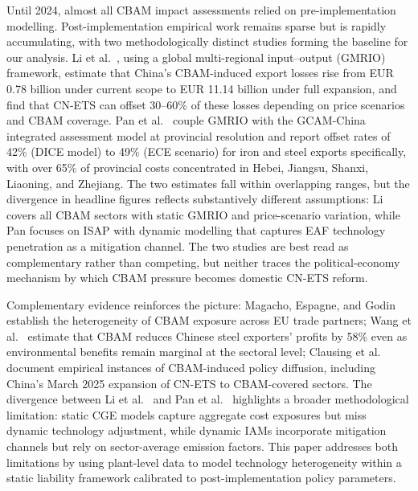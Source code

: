 \documentclass[letterpaper, 10pt, conference]{ieeeconf}
\begin{document}
Until 2024, almost all CBAM impact assessments relied on pre-implementation modelling. Post-implementation empirical work remains sparse but is rapidly accumulating, with two methodologically distinct studies forming the baseline for our analysis. Li et al.\ \citeyearpar{Li2026}, using a global multi-regional input--output (GMRIO) framework, estimate that China's CBAM-induced export losses rise from EUR 0.78 billion under current scope to EUR 11.14 billion under full expansion, and find that CN-ETS can offset 30--60\% of these losses depending on price scenarios and CBAM coverage. Pan et al.\ \citeyearpar{Pan2025} couple GMRIO with the GCAM-China integrated assessment model at provincial resolution and report offset rates of 42\% (DICE model) to 49\% (ECE scenario) for iron and steel exports specifically, with over 65\% of provincial costs concentrated in Hebei, Jiangsu, Shanxi, Liaoning, and Zhejiang. The two estimates fall within overlapping ranges, but the divergence in headline figures reflects substantively different assumptions: Li covers all CBAM sectors with static GMRIO and price-scenario variation, while Pan focuses on ISAP with dynamic modelling that captures EAF technology penetration as a mitigation channel. The two studies are best read as complementary rather than competing, but neither traces the political-economy mechanism by which CBAM pressure becomes domestic CN-ETS reform.

Complementary evidence reinforces the picture: Magacho, Espagne, and Godin \citeyearpar{Magacho2024} establish the heterogeneity of CBAM exposure across EU trade partners; Wang et al.\ \citeyearpar{Wang2024} estimate that CBAM reduces Chinese steel exporters' profits by 58\% even as environmental benefits remain marginal at the sectoral level; Clausing et al.\ \citeyearpar{Clausing2025} document empirical instances of CBAM-induced policy diffusion, including China's March 2025 expansion of CN-ETS to CBAM-covered sectors. The divergence between Li et al.\ \citeyearpar{Li2026} and Pan et al.\ \citeyearpar{Pan2025} highlights a broader methodological limitation: static CGE models capture aggregate cost exposures but miss dynamic technology adjustment, while dynamic IAMs incorporate mitigation channels but rely on sector-average emission factors. This paper addresses both limitations by using plant-level data to model technology heterogeneity within a static liability framework calibrated to post-implementation policy parameters.
\end{document}
